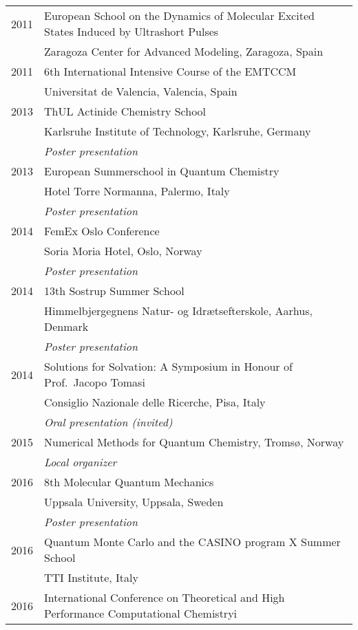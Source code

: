 \documentclass[notitlepage,a4paper,11pt]{article}
\begin{document}
\begin{itemize}
  \begin{tabular}{ll}
    2011 & European School on the Dynamics of Molecular Excited States Induced by Ultrashort Pulses \\
         & Zaragoza Center for Advanced Modeling, Zaragoza, Spain \\
    2011 & 6th International Intensive Course of the EMTCCM \\
         & Universitat de Valencia, Valencia, Spain \\
    2013 & ThUL Actinide Chemistry School \\
         & Karlsruhe Institute of Technology, Karlsruhe, Germany \\
         & \emph{Poster presentation} \\
    2013 & European Summerschool in Quantum Chemistry \\
         & Hotel Torre Normanna, Palermo, Italy \\
         & \emph{Poster presentation} \\
    2014 & FemEx Oslo Conference \\
         & Soria Moria Hotel, Oslo, Norway \\ %
         & \emph{Poster presentation} \\
    2014 & 13th Sostrup Summer School \\
         & Himmelbjergegnens Natur- og Idrætsefterskole, Aarhus, Denmark \\ %
         & \emph{Poster presentation} \\
    2014 & Solutions for Solvation: A Symposium in Honour of Prof.~Jacopo Tomasi \\
         & Consiglio Nazionale delle Ricerche, Pisa, Italy \\ %
         & \emph{Oral presentation (invited)} \\
    2015 & Numerical Methods for Quantum Chemistry, Tromsø, Norway \\
         & \emph{Local organizer} \\
    2016 & 8th Molecular Quantum Mechanics \\
         & Uppsala University, Uppsala, Sweden \\ 
         & \emph{Poster presentation} \\
    2016 & Quantum Monte Carlo and the CASINO program X Summer School \\
         & TTI Institute, Italy \\
    2016 & International Conference on Theoretical and High Performance Computational Chemistryi \\

\end{tabular}
\end{itemize}
\end{document}
